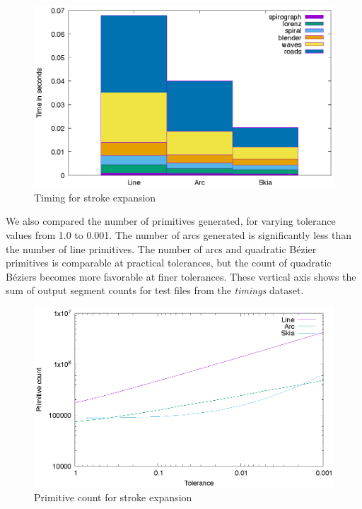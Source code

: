 \documentclass[sigconf, authordraft]{acmart}
\begin{document}
\begin{figure}
    \includegraphics[scale=0.6]{timings}
    \caption{Timing for stroke expansion}
    \label{fig:timings}
\end{figure}

We also compared the number of primitives generated, for varying tolerance values from 1.0 to 0.001. The number of arcs generated is significantly less than the number of line primitives. The number of arcs and quadratic Bézier primitives is comparable at practical tolerances, but the count of quadratic Béziers becomes more favorable at finer tolerances. These vertical axis shows the sum of output segment counts for test files from the \emph{timings} dataset.

\begin{figure}
    \includegraphics[scale=0.6]{prim_count}
    \caption{Primitive count for stroke expansion}
    \label{fig:prim_count}
\end{figure}
\end{document}
